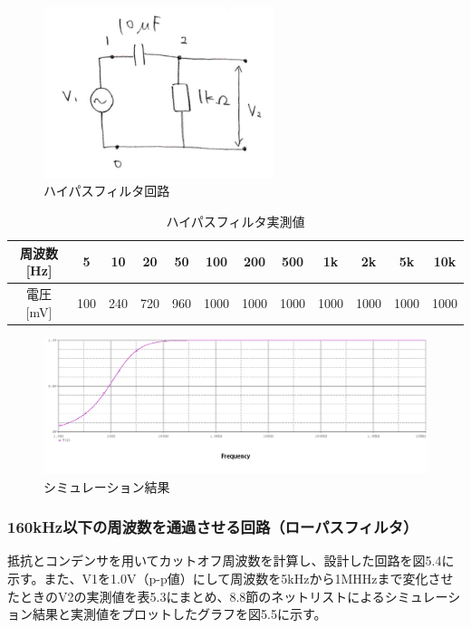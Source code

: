 \documentclass{jlreq}
\numberwithin{equation}{section}
\begin{document}
\begin{figure}[H]
  \centering
  \includegraphics[width=0.6\textwidth]{assets/highpasskairo.png}
  \caption{ハイパスフィルタ回路}
\end{figure}

\begin{table}[H]
  \centering
  \caption{ハイパスフィルタ実測値}
  \begin{tabular}{|c|c|c|c|c|c|c|c|c|c|c|c|}
    \hline
    周波数 [Hz] & 5 & 10 & 20 & 50 & 100 & 200 & 500 & 1k & 2k & 5k & 10k \\ \hline
    電圧 [mV] & 100 & 240 & 720 & 960 & 1000 & 1000 & 1000 & 1000 & 1000 & 1000 & 1000 \\ \hline
  \end{tabular}
\end{table}

\begin{figure}[H]
  \centering
  \includegraphics[width=\textwidth]{assets/highpass.png}
  \caption{シミュレーション結果}
\end{figure}

\subsubsection{160kHz以下の周波数を通過させる回路（ローパスフィルタ）}
抵抗とコンデンサを用いてカットオフ周波数を計算し、設計した回路を図5.4に示す。また、V1を1.0V（p-p値）にして周波数を5kHzから1MHHzまで変化させたときのV2の実測値を表5.3にまとめ、8.8節のネットリストによるシミュレーション結果と実測値をプロットしたグラフを図5.5に示す。
\end{document}
